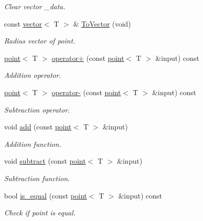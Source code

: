 \begin{DoxyCompactItemize}
\begin{DoxyCompactList}\small\item\em Clear vector \+\_\+data. \end{DoxyCompactList}\item 
\mbox{\label{classddd_1_1point_a3d8e57af2dfe4b200dc2b7ca63ff554a}} 
const \hyperlink{classddd_1_1vector}{vector}$<$ T $>$ \& \hyperlink{classddd_1_1point_a3d8e57af2dfe4b200dc2b7ca63ff554a}{To\+Vector} (void)
\begin{DoxyCompactList}\small\item\em Radius vector of point. \end{DoxyCompactList}\item 
\hyperlink{classddd_1_1point}{point}$<$ T $>$ \hyperlink{classddd_1_1point_ab0b0c990b117bb889d34d44509b645be}{operator+} (const \hyperlink{classddd_1_1point}{point}$<$ T $>$ \&input) const
\begin{DoxyCompactList}\small\item\em Addition operator. \end{DoxyCompactList}\item 
\hyperlink{classddd_1_1point}{point}$<$ T $>$ \hyperlink{classddd_1_1point_a5621f5a883c88d5588e09f9ff0de6575}{operator-\/} (const \hyperlink{classddd_1_1point}{point}$<$ T $>$ \&input) const
\begin{DoxyCompactList}\small\item\em Subtraction operator. \end{DoxyCompactList}\item 
void \hyperlink{classddd_1_1point_a66ad14a1d50eb4170c874f75b77e8b0b}{add} (const \hyperlink{classddd_1_1point}{point}$<$ T $>$ \&input)
\begin{DoxyCompactList}\small\item\em Addition function. \end{DoxyCompactList}\item 
void \hyperlink{classddd_1_1point_abf2e2ea5474534eb17d1cb6bd96b7913}{subtract} (const \hyperlink{classddd_1_1point}{point}$<$ T $>$ \&input)
\begin{DoxyCompactList}\small\item\em Subtraction function. \end{DoxyCompactList}\item 
bool \hyperlink{classddd_1_1point_aa4cdbbf16736ee09e840e33f77e94b8a}{is\+\_\+equal} (const \hyperlink{classddd_1_1point}{point}$<$ T $>$ \&input) const
\begin{DoxyCompactList}\small\item\em Check if point is equal. \end{DoxyCompactList}\item 

\end{DoxyCompactItemize}
